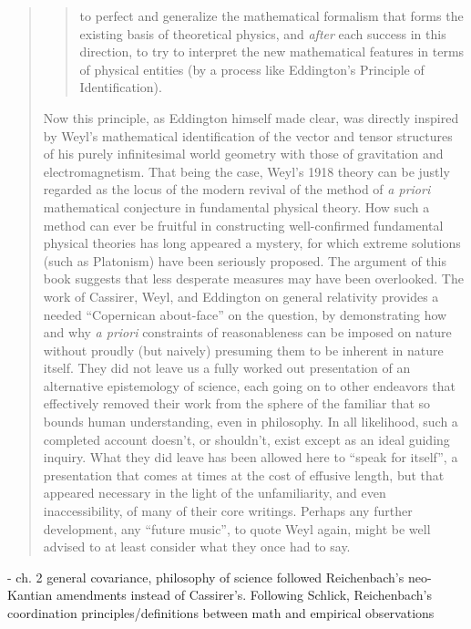 \begin{quote}
    \begin{quote}
        to perfect and generalize the mathematical formalism that forms the existing basis of theoretical physics, and \emph{after} each success in this direction, to try to interpret the new mathematical features in terms of physical entities (by a process like Eddington's Principle of Identification).
    \end{quote}
    
    Now this principle, as Eddington himself made clear, was directly inspired by Weyl's mathematical identification of the vector and tensor structures of his purely infinitesimal world geometry with those of gravitation and electromagnetism.  That being the case, Weyl's 1918 theory can be justly regarded as the locus of the modern revival of the method of \emph{a priori} mathematical conjecture in fundamental physical theory.  How such a method can ever be fruitful in constructing well-confirmed fundamental physical theories has long appeared a mystery, for which extreme solutions (such as Platonism) have been seriously proposed.  The argument of this book suggests that less desperate measures may have been overlooked.  The work of Cassirer, Weyl, and Eddington on general relativity provides a needed ``Copernican about-face'' on the question, by demonstrating how and why \emph{a priori} constraints of reasonableness can be imposed on nature without proudly (but naively) presuming them to be inherent in nature itself.  They did not leave us a fully worked out presentation of an alternative epistemology of science, each going on to other endeavors that effectively removed their work from the sphere of the familiar that so bounds human understanding, even in philosophy.  In all likelihood, such a completed account doesn't, or shouldn't, exist except as an ideal guiding inquiry.  What they did leave has been allowed here to ``speak for itself'', a presentation that comes at times at the cost of effusive length, but that appeared necessary in the light of the unfamiliarity, and even inaccessibility, of many of their core writings.  Perhaps any further development, any ``future music'', to quote Weyl again, might be well advised to at least consider what they once had to say.
    
    \citep[p. 8-12]{Ryckman2005}
\end{quote}

- ch. 2 general covariance, philosophy of science followed Reichenbach's neo-Kantian amendments instead of Cassirer's.  Following Schlick, Reichenbach's coordination principles/definitions between math and empirical observations 

